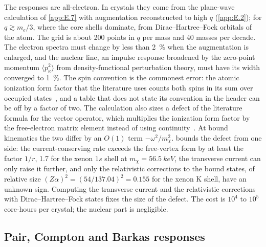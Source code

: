The responses are all-electron. In crystals they come from the plane-wave calculation of \cref{app:E.7} with augmentation reconstructed to high $q$ (\cref{app:E.2}); for $q \gtrsim m_e/3$, where the core shells dominate, from Dirac--Hartree--Fock orbitals of the atom. The grid is about 200 points in $q$ per mass and 40 masses per decade. The electron spectra must change by less than \SI{2}{\percent} when the augmentation is enlarged, and the nuclear line, an impulse response broadened by the zero-point momentum $\langle p_\kappa^2\rangle$ from density-functional perturbation theory, must have its width converged to \SI{1}{\percent}. The spin convention is the commonest error: the atomic ionization form factor that the literature uses counts both spins in its sum over occupied states~\cite[Eqs.~(A.18)--(A.21)]{essig2016direct}, and a table that does not state its convention in the header can be off by a factor of two. The calculation also sizes a defect of the literature formula for the vector operator, which multiplies the ionization form factor by the free-electron matrix element instead of using continuity~\cite[Eq.~(9)]{dror2021absorption}. At bound kinematics the two differ by an $O(1)$ term $-\omega^2/m_\chi^2$.  bounds the defect from one side: the current-conserving rate exceeds the free-vertex form by at least the factor $1/r$, 1.7 for the xenon $1s$ shell at $m_\chi = \SI{56.5}{keV}$, the transverse current can only raise it further, and only the relativistic corrections to the bound states, of relative size $(Z\alpha)^2 = (54/137.04)^2 = 0.155$ for the xenon K shell, have an unknown sign. Computing the transverse current and the relativistic corrections with Dirac--Hartree--Fock states fixes the size of the defect. The cost is $10^{4}$ to $10^{5}$ core-hours per crystal; the nuclear part is negligible.

\subsection{Pair, Compton and Barkas responses}


